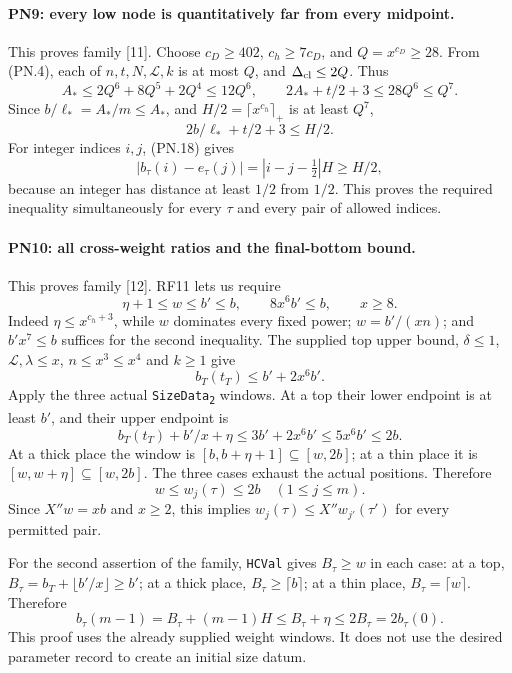 \paragraph{PN9: every low node is quantitatively far from every midpoint.}
This proves family [11]. Choose $c_D\geq402$, $c_h\geq7c_D$,
and $Q=x^{c_D}\geq28$. From (PN.4), each of $n,t,N,\mathcal L,k$
is at most $Q$, and $\Delta_{\rm cl}\leq2Q$. Thus
\[
 A_*\leq2Q^6+8Q^5+2Q^4\leq12Q^6,
 \qquad 2A_*+t/2+3\leq28Q^6\leq Q^7.                   \tag{PN.22}
\]
Since $b/\ell_*=A_*/m\leq A_*$, and $H/2=\lceil x^{c_h}\rceil_+$
is at least $Q^7$,
\[
                 2b/\ell_*+t/2+3\leq H/2.
\]
For integer indices $i,j$, (PN.18) gives
\[
 |b_\tau(i)-e_\tau(j)|=|i-j-\tfrac12|H\geq H/2,
                                                               \tag{PN.23}
\]
because an integer has distance at least $1/2$ from $1/2$.
This proves the required inequality simultaneously for every
$\tau$ and every pair of allowed indices.

\paragraph{PN10: all cross-weight ratios and the final-bottom bound.}
This proves family [12]. RF11 lets us require
\[
               \eta+1\leq w\leq b'\leq b,
               \qquad 8x^6b'\leq b,\qquad x\geq8.        \tag{PN.24}
\]
Indeed $\eta\leq x^{c_h+3}$, while $w$ dominates every fixed
power; $w=b'/(xn)$; and $b'x^7\leq b$ suffices for the second
inequality. The supplied top upper bound, $\delta\leq1$,
$\mathcal L,\lambda\leq x$, $n\leq x^3\leq x^4$ and $k\geq1$
give
\[
              b_T(t_T)\leq b'+2x^6b'.                       \tag{PN.25}
\]
Apply the three actual \texttt{SizeData\textsubscript{2}} windows.
At a top their lower endpoint is at least $b'$, and their upper
endpoint is
\[
 b_T(t_T)+b'/x+\eta\leq3b'+2x^6b'\leq5x^6b'\leq2b.
\]
At a thick place the window is $[b,b+\eta+1]\subseteq[w,2b]$;
at a thin place it is $[w,w+\eta]\subseteq[w,2b]$.
The three cases exhaust the actual positions. Therefore
\[
          w\leq w_j(\tau)\leq2b
                  \quad(1\leq j\leq m).                   \tag{PN.26}
\]
Since $X''w=xb$ and $x\geq2$, this implies
$w_j(\tau)\leq X''w_{j'}(\tau')$ for every permitted pair.

For the second assertion of the family, \texttt{HCVal} gives
$B_\tau\geq w$ in each case: at a top,
$B_\tau=b_T+\lfloor b'/x\rfloor\geq b'$; at a thick place,
$B_\tau\geq\lceil b\rceil$; at a thin place,
$B_\tau=\lceil w\rceil$. Therefore
\[
 b_\tau(m-1)=B_\tau+(m-1)H
                \leq B_\tau+\eta\leq2B_\tau=2b_\tau(0).
                                                               \tag{PN.27}
\]
This proof uses the already supplied weight windows. It does not use
the desired parameter record to create an initial size datum.

